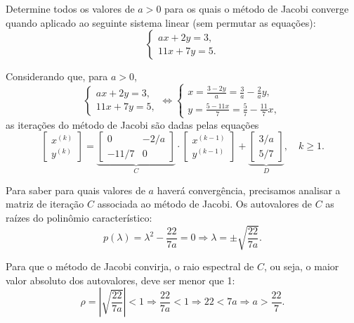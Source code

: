 \documentclass[12pt,a4paper]{article}
\begin{document}
\begin{ExerciseList}
\Exercise[title={2,5}] Determine todos os valores de \(a > 0\) para os quais o método de Jacobi converge quando aplicado ao seguinte sistema linear (sem permutar as equações):
\[
\begin{cases}
    ax + 2y = 3, \\
    11x + 7y = 5.
\end{cases}
\]

\Answer Considerando que, para $a > 0$,
\[
\begin{cases}
    ax + 2y = 3, \\
    11x + 7y = 5,
\end{cases}
\Leftrightarrow
\begin{cases}
    x = \frac{3-2y}{a} = \frac{3}{a} -\frac{2}{a}y, \\
    y = \frac{5-11x}{7} = \frac{5}{7} - \frac{11}{7}x,
\end{cases}
\]
as iterações do método de Jacobi são dadas pelas equações
\[
\begin{bmatrix}
    x^{(k)}\\y^{(k)}
\end{bmatrix}
=
\underbrace{
\begin{bmatrix}
    0            & -2/a\\
    -11/7 & 0
\end{bmatrix}
}_{C}
\cdot
\begin{bmatrix}
    x^{(k-1)}\\y^{(k-1)}
\end{bmatrix}
+\underbrace{
\begin{bmatrix}
    3/a\\
    5/7
\end{bmatrix}
}_{D},
\quad k \geq 1.
\]

Para saber para quais valores de $a$ haverá convergência, precisamos analisar a matriz de iteração $C$ associada ao método de Jacobi. Os autovalores de \(C\) as raízes do polinômio característico:
\[
p(\lambda) = \lambda^2 - \frac{22}{7a} = 0
\Rightarrow
\lambda = \pm \sqrt{\frac{22}{7a}}.
\]

Para que o método de Jacobi convirja, o raio espectral de \(C\), ou seja, o maior valor absoluto dos autovalores, deve ser menor que 1:
\[
\rho = \left|\sqrt{\frac{22}{7a}}\right| < 1
\Rightarrow
\frac{22}{7a} < 1
\Rightarrow
22 < 7a
\Rightarrow
a > \frac{22}{7}.
\]


\end{ExerciseList}
\end{document}
